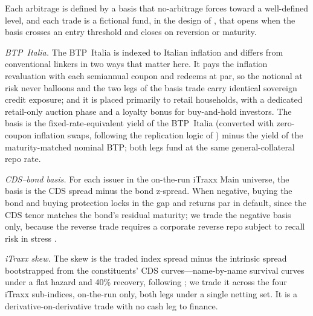 
Each arbitrage is defined by a basis that no-arbitrage forces toward a
well-defined level, and each trade is a fictional fund, in the design of
\citet{duarte2007risk}, that opens when the basis crosses an entry threshold
and closes on reversion or maturity.

\emph{BTP~Italia.} The BTP~Italia is indexed to Italian inflation and differs
from conventional linkers in two ways that matter here. It pays the inflation
revaluation with each semiannual coupon and redeems at par, so the notional at
risk never balloons and the two legs of the basis trade carry identical
sovereign credit exposure; and it is placed primarily to retail households,
with a dedicated retail-only auction phase and a loyalty bonus for
buy-and-hold investors. The basis is the fixed-rate-equivalent yield of the
BTP~Italia (converted with zero-coupon inflation swaps, following the
replication logic of \citealp{fleckenstein2014tips}) minus the yield of the
maturity-matched nominal BTP; both legs fund at the same general-collateral
repo rate.

\emph{CDS--bond basis.} For each issuer in the on-the-run iTraxx Main
universe, the basis is the CDS spread minus the bond z-spread. When negative,
buying the bond and buying protection locks in the gap and returns par in
default, since the CDS tenor matches the bond's residual maturity; we trade
the negative basis only, because the reverse trade requires a corporate
reverse repo subject to recall risk in stress \citep{bai2019cds}.

\emph{iTraxx skew.} The skew is the traded index spread minus the intrinsic
spread bootstrapped from the constituents' CDS curves---name-by-name survival
curves under a flat hazard and 40\% recovery, following
\citet{o2008modelling}; we trade it across the
four iTraxx sub-indices, on-the-run only, both legs under a single netting
set. It is a derivative-on-derivative trade with no cash leg to finance.

